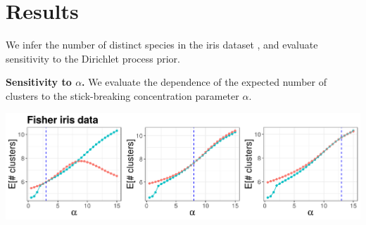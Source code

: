 \documentclass[a0,plainsections,30pt]{sciposter}\usepackage[]{graphicx}\usepackage[]{color}
\newenvironment{knitrout}{}{} %
\begin{document}
\begin{minipage}[t]{0.45\textwidth}
\section*{Results}
\vspace{-0.3in}


We infer the number of distinct species in the iris
dataset \cite{iris_data_anderson}, and evaluate sensitivity to the Dirichlet process prior.
\vspace{0.1in}

{\bf \large Sensitivity to $\alpha$.}
We evaluate the dependence of the expected number of clusters to the stick-breaking concentration parameter $\alpha$.

\vspace{0.05in}
%

\begin{knitrout}
\color{fgcolor}

{\centering \includegraphics[width=0.98\linewidth,height=0.294\linewidth]{figure/param_sens_plot-1} 

}
\end{knitrout}
\end{minipage}
\end{document}
